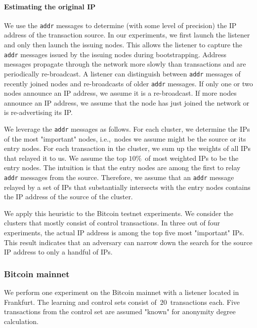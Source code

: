 \paragraph{Estimating the original IP}

We use the \texttt{addr} messages to determine (with some level of precision) the IP address of the transaction source.
In our experiments, we first launch the listener and only then launch the issuing nodes.
This allows the listener to capture the \texttt{addr} messages issued by the issuing nodes during bootstrapping.
Address messages propagate through the network more slowly than transactions and are periodically re-broadcast.
A listener can distinguish between \texttt{addr} messages of recently joined nodes and re-broadcasts of older \texttt{addr} messages.
If only one or two nodes announce an IP address, we assume it is a re-broadcast.
If more nodes announce an IP address, we assume that the node has just joined the network or is re-advertising its IP.

We leverage the \texttt{addr} messages as follows.
For each cluster, we determine the IPs of the most "important" nodes, i.e.,~nodes we assume might be the source or its entry nodes.
For each transaction in the cluster, we sum up the weights of all IPs that relayed it to us.
We assume the top $10\%$~of most weighted IPs to be the entry nodes.
The intuition is that the entry nodes are among the first to relay \texttt{addr} messages from the source.
Therefore, we assume that an \texttt{addr} message relayed by a set of IPs that substantially intersects with the entry nodes contains the IP address of the source of the cluster.

We apply this heuristic to the Bitcoin testnet experiments.
We consider the clusters that mostly consist of control transactions.
In three out of four experiments, the actual IP address is among the top five most "important" IPs.
This result indicates that an adversary can narrow down the search for the source IP address to only a handful of IPs.

\subsubsection{Bitcoin mainnet}

We perform one experiment on the Bitcoin mainnet with a listener located in Frankfurt.
The learning and control sets consist of~$20$~transactions each.
Five transactions from the control set are assumed "known" for anonymity degree calculation.

